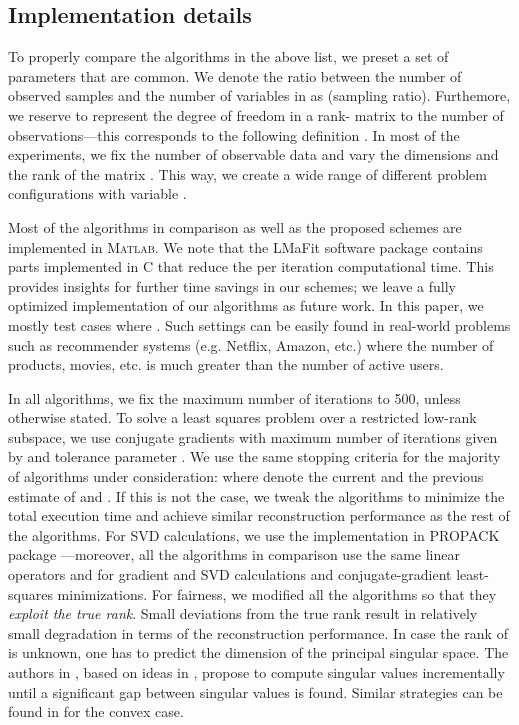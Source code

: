 \documentclass[twocolumn]{svjour3}
\begin{document}
\subsection{Implementation details}
To properly compare the algorithms in the above list, we preset a set of parameters that are common. We denote the ratio between the number of observed samples and the number of variables in  as  (sampling ratio). Furthemore, we reserve  to represent the degree of freedom in a rank- matrix to the number of observations---this corresponds to the following definition . In most of the experiments, we fix the number of observable data  and vary the dimensions and the rank  of the matrix . This way, we create a wide range of different problem configurations with variable . 

Most of the algorithms in comparison as well as the proposed schemes are implemented in \textsc{Matlab}. We note that the LMaFit software package contains parts implemented in C that reduce the per iteration computational time. This provides insights for further time savings in our schemes; we leave a fully optimized implementation of our algorithms as future work. In this paper, we mostly test cases where . Such settings can be easily found in real-world problems such as recommender systems (e.g. Netflix, Amazon, etc.) where the number of products, movies, etc. is much greater than the number of active users.

In all algorithms, we fix the maximum number of iterations to 500, unless otherwise stated. To solve a least squares problem over a restricted low-rank subspace, we use conjugate gradients with maximum number of iterations given by  and tolerance parameter . We use the same stopping criteria for the majority of algorithms under consideration:
 where  denote the current and the previous estimate of  and . If this is not the case, we tweak the algorithms to minimize the total execution time and achieve similar reconstruction performance as the rest of the algorithms. For SVD calculations, we use the  implementation in PROPACK package \cite{propack}---moreover, all the algorithms in comparison use the same linear operators  and  for gradient and SVD calculations and conjugate-gradient least-squares minimizations. For fairness, we modified all the algorithms so that they {\it exploit the true rank}. Small deviations from the true rank result in relatively small degradation in terms of the reconstruction performance. In case the rank of  is unknown, one has to predict the dimension of the principal singular space. The authors in \cite{SVP}, based on ideas in \cite{OptSpace}, propose to compute singular values incrementally until a significant gap between singular values is found. Similar strategies can be found in \cite{ALM} for the convex case.
\end{document}
